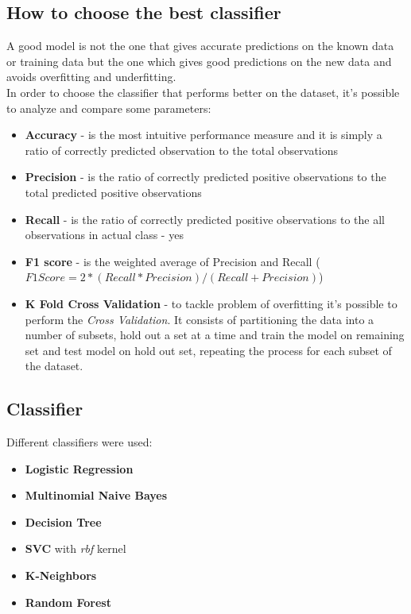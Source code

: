 \documentclass[11pt]{article}
\begin{document}
\subsection{How to choose the best classifier}
A good model is not the one that gives accurate predictions on the known data or training data but the one which gives good predictions on the new data and avoids overfitting and underfitting. \\
In order to choose the classifier that performs better on the dataset, it's possible to analyze and compare some parameters:
\begin{itemize}
	\item \textbf{Accuracy} - is the most intuitive performance measure and it is simply a ratio of correctly predicted observation to the total observations
	\item \textbf{Precision} - is the ratio of correctly predicted positive observations to the total predicted positive observations
	\item \textbf{Recall} - is the ratio of correctly predicted positive observations to the all observations in actual class - yes
	\item \textbf{F1 score} - is the weighted average of Precision and Recall ($F1 Score = 2*(Recall * Precision) / (Recall + Precision)$)
	\item \textbf{K Fold Cross Validation} - to tackle problem of overfitting it's possible to perform the \textit{Cross Validation}. It consists of partitioning the data into a number of subsets, hold out a set at a time and train the model on remaining set and test model on hold out set, repeating the process for each subset of the dataset.
\end{itemize}

\subsection{Classifier}
Different classifiers were used:
\begin{itemize}
	\item \textbf{Logistic Regression}
	\item \textbf{Multinomial Naive Bayes}
	\item \textbf{Decision Tree}
	\item \textbf{SVC} with \textit{rbf} kernel
	\item \textbf{K-Neighbors}
	\item \textbf{Random Forest}
\end{itemize}
\end{document}
